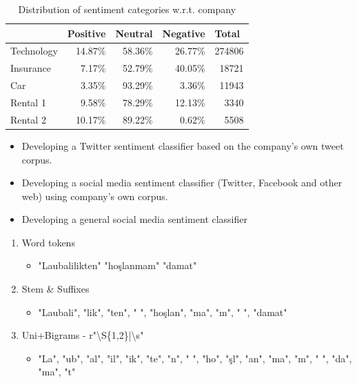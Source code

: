 \documentclass[17pt]{beamer}
\begin{document}
\begin{frame}%
	\begin{table}[htbp]
		\centering
		\caption{Distribution of sentiment categories w.r.t. company}
		\begin{tabular}{lrrrr}
			\toprule
			& \multicolumn{1}{l}{Positive} & \multicolumn{1}{l}{Neutral } & \multicolumn{1}{l}{Negative} & \multicolumn{1}{l}{Total} \\
			\midrule
			Technology & 14.87\% & 58.36\% & 26.77\% & 274806 \\
			Insurance & 7.17\% & 52.79\% & 40.05\% & 18721 \\
			Car   & 3.35\% & 93.29\% & 3.36\% & 11943 \\
			Rental 1 & 9.58\% & 78.29\% & 12.13\% & 3340 \\
			Rental 2 & 10.17\% & 89.22\% & 0.62\% & 5508 \\
			\bottomrule
		\end{tabular}%
		\label{table:sentiment_distribution}
	\end{table}%
\end{frame}


\begin{frame}%
	\begin{itemize}
		\item Developing a Twitter sentiment classifier based on the company's own tweet corpus.
		\item Developing a social media sentiment classifier (Twitter, Facebook and other web) using company's own corpus.
		\item Developing a general social media sentiment classifier
	\end{itemize}
		
\end{frame}

\begin{frame}%
	\begin{enumerate}
		\item Word tokens
		\begin{itemize}
			\item "Laubalilikten" "hoşlanmam" "damat"
		\end{itemize}
		\item Stem \& Suffixes
		\begin{itemize}
			\item "Laubali", "lik", "ten", " ", "hoşlan", "ma", "m", " ", "damat"
		\end{itemize}
		\item Uni+Bigrams -  r"\textbackslash S\{1,2\}|\textbackslash s"
		\begin{itemize}
			\item "La", "ub", "al", "il", "ik", "te", "n", " ", "ho", "şl", "an", "ma", "m", " ", "da", "ma", "t"
		\end{itemize}
	\end{enumerate}
\end{frame}
\end{document}
